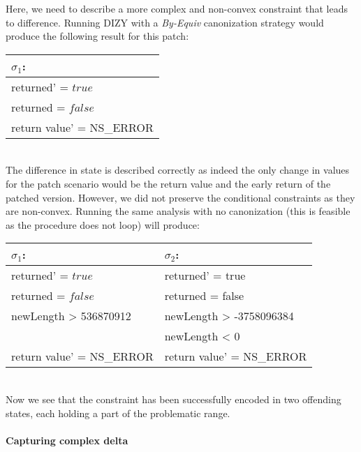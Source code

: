 Here, we need to describe a more complex and non-convex constraint that leads to difference. Running DIZY with a \emph{By-Equiv} canonization strategy would produce the following result for this patch:
\\
\begin{tabular}{l}
$\sigma_1$:                                        
\\ \hline
returned' = $true$                               
\\
returned = $false$                                
\\
return value' = NS\_ERROR                          
\\ \hline
\end{tabular}
\\
The difference in state is described correctly as indeed the only change in values for the patch scenario would be the return value and the early return of the patched version. However, we did not preserve the conditional constraints as they are non-convex. Running the same analysis with no canonization (this is feasible as the procedure does not loop) will produce:
\\
\begin{tabular}{l|l}
$\sigma_1$:                                         & $\sigma_2$:
\\ \hline
returned' = $true$                                  & returned' = true
\\
returned = $false$                                  & returned = false
\\
newLength > 536870912                               & newLength > -3758096384
\\
                                                    & newLength < 0
\\
return value' = NS\_ERROR                           & return value' = NS\_ERROR
\\ \hline
\end{tabular}
\\
Now we see that the  constraint has been successfully encoded in two offending states, each holding a part of the problematic range.

\paragraph{Capturing complex delta}



